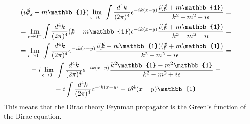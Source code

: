 \documentclass{article}
\begin{document}
\begin{equation}
\begin{gathered}
    (i\slashed{\partial}_x - m\mathbb{1})\lim_{\epsilon\rightarrow0^{+}} \int \frac{d^4k}{(2\pi)^4} e^{-ik(x-y)}\frac{i(\slashed{k} + m\mathbb{1})}{k^2 - m^2 + i\epsilon} = \\ =
    \lim_{\epsilon\rightarrow0^{+}} \int \frac{d^4k}{(2\pi)^4} (\slashed{k} - m\mathbb{1}) e^{-ik(x-y)}\frac{i(\slashed{k} + m\mathbb{1})}{k^2 - m^2 + i\epsilon} = \\ =
    \lim_{\epsilon\rightarrow0^{+}} \int \frac{d^4k}{(2\pi)^4}e^{-ik(x-y)}\frac{i(\slashed{k} - m\mathbb{1})(\slashed{k} + m\mathbb{1})}{k^2 - m^2 + i\epsilon} = \\ =
    i\lim_{\epsilon\rightarrow0^{+}} \int \frac{d^4k}{(2\pi)^4}e^{-ik(x-y)}\frac{k^2\mathbb{1} - m^2\mathbb{1}}{k^2 - m^2 + i\epsilon} = \\ =
    i\int \frac{d^4k}{(2\pi)^4}e^{-ik(x-y)} = i\delta^4(x - y) \mathbb{1}
\end{gathered}
\end{equation}
This means that the Dirac theory Feynman propagator is the Green's function of the Dirac equation.
\end{document}
